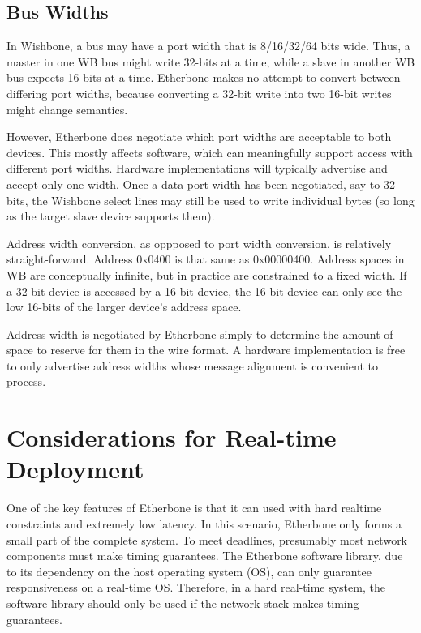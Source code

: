 \documentclass{article}
\begin{document}
\subsection{Bus Widths}

In Wishbone, 
a bus may have a port width that is 8/16/32/64 bits wide.
Thus, a master in one WB bus might write 32-bits at a time,
while a slave in another WB bus expects 16-bits at a time.
Etherbone makes no attempt to convert between differing port widths,
because converting a 32-bit write into two 16-bit writes might change semantics.

However, 
Etherbone does negotiate which port widths are acceptable to both devices.
This mostly affects software,
which can meaningfully support access with different port widths.
Hardware implementations will typically advertise and accept only one width.
Once a data port width has been negotiated, say to 32-bits, 
the Wishbone select lines may still be used to write individual bytes
(so long as the target slave device supports them). 

Address width conversion, as oppposed to port width conversion,
is relatively straight-forward.
Address 0x0400 is that same as 0x00000400.
Address spaces in WB are conceptually infinite, 
but in practice are constrained to a fixed width.
If a 32-bit device is accessed by a 16-bit device,
the 16-bit device can only see the low 16-bits of the larger device's address space.

Address width is negotiated by Etherbone simply to determine the amount of
space to reserve for them in the wire format.
A hardware implementation is free to only advertise address widths
whose message alignment is convenient to process.

\section{Considerations for Real-time Deployment}
\label{sec:deployment}

One of the key features of Etherbone is that it can used with hard realtime constraints
and extremely low latency.
In this scenario, Etherbone only forms a small part of the complete system.
To meet deadlines, presumably most network components must make timing guarantees.
The Etherbone software library, 
due to its dependency on the host operating system (OS),
can only guarantee responsiveness on a real-time OS.
Therefore, in a hard real-time system,
the software library should only be used if the network stack 
makes timing guarantees.
\end{document}
